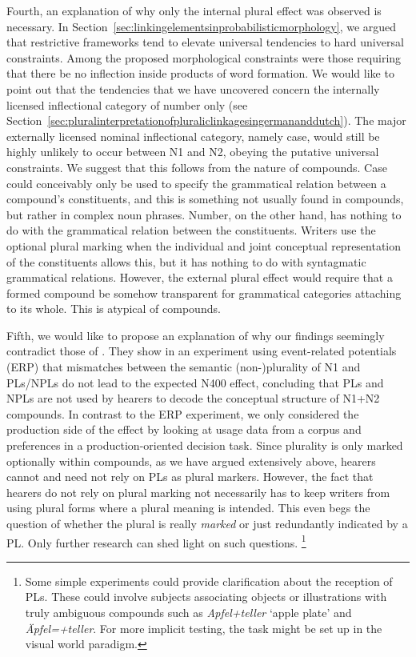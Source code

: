 Fourth, an explanation of why only the internal plural effect was observed is necessary.
In Section~\ref{sec:linkingelementsinprobabilisticmorphology}, we argued that restrictive frameworks tend to elevate universal tendencies to hard universal constraints.
Among the proposed morphological constraints were those requiring that there be no inflection inside products of word formation.
We would like to point out that the tendencies that we have uncovered concern the internally licensed inflectional category of number only (see Section~\ref{sec:pluralinterpretationofpluraliclinkagesingermananddutch}).
The major externally licensed nominal inflectional category, namely case, would still be highly unlikely to occur between N1 and N2, obeying the putative universal constraints.
We suggest that this follows from the nature of compounds.
Case could conceivably only be used to specify the grammatical relation between a compound's constituents, and this is something not usually found in compounds, but rather in complex noun phrases.
Number, on the other hand, has nothing to do with the grammatical relation between the constituents.
Writers use the optional plural marking when the individual and joint conceptual representation of the constituents allows this, but it has nothing to do with syntagmatic grammatical relations.
However, the external plural effect would require that a formed compound be somehow transparent for grammatical categories attaching to its whole.
This is atypical of compounds.

Fifth, we would like to propose an explanation of why our findings seemingly contradict those of \textcite{KoesterEa2004}.
They show in an experiment using event-related potentials (ERP) that mismatches between the semantic (non-)plurality of N1 and PLs\slash NPLs do not lead to the expected N400 effect, concluding that PLs and NPLs are not used by hearers to decode the conceptual structure of N1+N2 compounds.
In contrast to the ERP experiment, we only considered the production side of the effect by looking at usage data from a corpus and preferences in a production-oriented decision task.
Since plurality is only marked optionally within compounds, as we have argued extensively above, hearers cannot and need not rely on PLs as plural markers.
However, the fact that hearers do not rely on plural marking not necessarily has to keep writers from using plural forms where a plural meaning is intended.
This even begs the question of whether the plural is really \textit{marked} or just redundantly indicated by a PL.
Only further research can shed light on such questions.%
\footnote{Some simple experiments could provide clarification about the reception of PLs.
These could involve subjects associating objects or illustrations with truly ambiguous compounds such as \textit{Apfel+teller} `apple plate' and \textit{Äpfel=+teller}.
For more implicit testing, the task might be set up in the visual world paradigm.}

